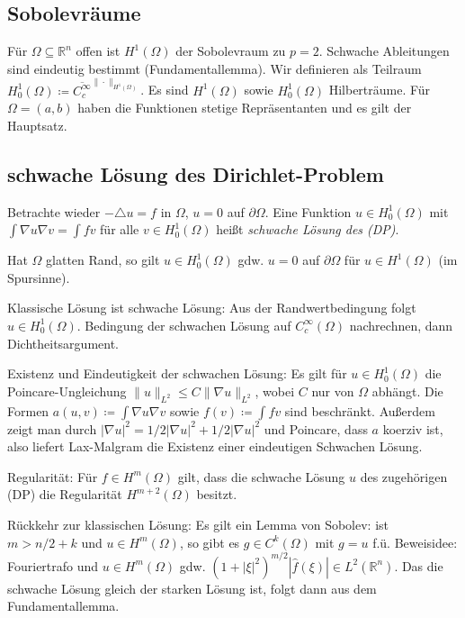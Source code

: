 \documentclass[11pt,a4paper]{scrartcl}
\newcommand{\R}{\mathbb{R}} %
\newcommand{\norm}[1]{\|#1\|}
\newcommand{\laplace}{\triangle}
\theoremstyle{plain}
\theoremstyle{definition}
\theoremstyle{remark}
\begin{document}
\subsection{Sobolevräume}

Für $\Omega \subseteq \R^n$ offen ist $H^1(\Omega)$ der Sobolevraum zu $p=2$. Schwache Ableitungen sind eindeutig bestimmt (Fundamentallemma). Wir definieren als Teilraum $H^1_0(\Omega)\coloneqq \overline{C_c^\infty}^{\norm{\cdot}_{H^1(\Omega)}}$. Es sind $H^1(\Omega)$ sowie $H^1_0(\Omega)$ Hilberträume. Für $\Omega=(a,b)$ haben die Funktionen stetige Repräsentanten und es gilt der Hauptsatz.

\subsection{schwache Lösung des Dirichlet-Problem}

Betrachte wieder $-\laplace u = f$ in $\Omega$, $u=0$ auf $\partial\Omega$. Eine Funktion $u\in H^1_0(\Omega)$ mit $\int \nabla u \nabla v = \int fv$ für alle $v\in H^1_0(\Omega)$ heißt \emph{schwache Lösung des (DP)}. 

Hat $\Omega$ glatten Rand, so gilt $u\in H^1_0(\Omega)$ gdw. $u=0$ auf $\partial\Omega$ für $u\in H^1(\Omega)$ (im Spursinne).

Klassische Lösung ist schwache Lösung: Aus der Randwertbedingung folgt $u\in H^1_0(\Omega)$. Bedingung der schwachen Lösung auf $C_c^\infty(\Omega)$ nachrechnen, dann Dichtheitsargument.

Existenz und Eindeutigkeit der schwachen Lösung: Es gilt für $u\in H^1_0(\Omega)$ die Poincare-Ungleichung $\norm{u}_{L^2} \leq C \norm{\nabla u}_{L^2}$, wobei $C$ nur von $\Omega$ abhängt. Die Formen $a(u,v)\coloneqq \int \nabla u \nabla v$ sowie $f(v)\coloneqq \int fv$ sind beschränkt. Außerdem zeigt man durch $|\nabla u|^2 = 1/2|\nabla u|^2 + 1/2|\nabla u|^2$ und Poincare, dass $a$ koerziv ist, also liefert Lax-Malgram die Existenz einer eindeutigen Schwachen Lösung.

Regularität: Für $f\in H^m(\Omega)$ gilt, dass die schwache Lösung $u$ des zugehörigen (DP) die Regularität $H^{m+2}(\Omega)$ besitzt.

Rückkehr zur klassischen Lösung: Es gilt ein Lemma von Sobolev: ist $m > n/2 + k$ und $u\in H^m(\Omega)$, so gibt es $g\in C^k(\Omega)$ mit $g=u$ f.ü. Beweisidee: Fouriertrafo und $u\in H^m(\Omega)$ gdw. $(1+|\xi|^2)^{m/2} |\hat f(\xi)| \in L^2(\R^n)$. Das die schwache Lösung gleich der starken Lösung ist, folgt dann aus dem Fundamentallemma.
\end{document}
